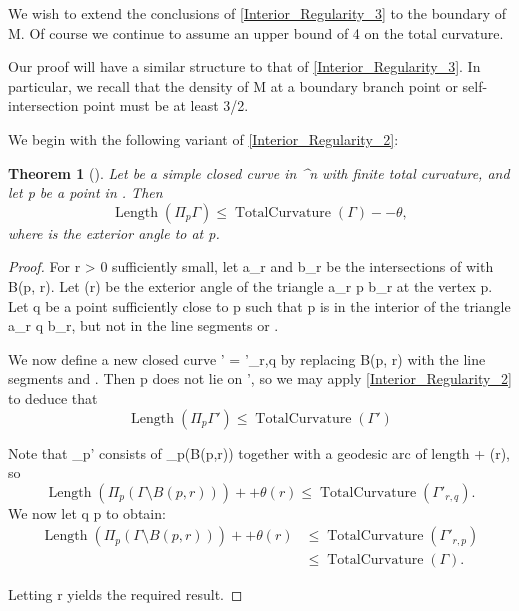 \documentclass[a4paper, 11pt]{article}
\theoremstyle{plain}
\newtheorem{theorem}{Theorem}[section]
\theoremstyle{definition}
\theoremstyle{remark}
\numberwithin{equation}{subsection}
\def\({}
\def\){}
\def\pi{}
\begin{document}
We wish to extend the conclusions of \cref{Interior_Regularity_3} to the boundary of \(M\). Of course we continue to assume an upper bound of \(4\pi\) on the total curvature.

Our proof will have a similar structure to that of \cref{Interior_Regularity_3}. In particular, we recall that the density of \(M\) at a boundary branch point or self-intersection point must be at least \(3/2\).

We begin with the following variant of \cref{Interior_Regularity_2}:

\begin{theorem}[{\cite[Theorem 3.1]{EWW02}}]
\label{Boundary_Regularity_1}
Let \(\Gamma\) be a simple closed curve in \(^{n}\) with finite total curvature, and let \(p\) be a point in \(\Gamma\). Then
\begin{equation}
\operatorname{Length}(\Pi_{p}\Gamma) \leqslant \operatorname{TotalCurvature}(\Gamma) - \pi - \theta,
\end{equation}
where \(\theta\) is the exterior angle to \(\Gamma\) at \(p\).
\end{theorem}

  
\begin{proof}
For \(r > 0\) sufficiently small, let \(a_{r}\) and \(b_{r}\) be the intersections of \(\Gamma\) with \(\partial B(p, r)\). Let \(\theta (r)\) be the exterior angle of the triangle \(\triangle a_{r} p b_{r}\) at the vertex \(p\). Let \(q\) be a point sufficiently close to \(p\) such that \(p\) is in the interior of the triangle \(\triangle a_{r} q b_{r}\), but not in the line segments \(\) or \(\).

We now define a new closed curve \(\Gamma' = \Gamma'_{r,q}\) by replacing \(\Gamma \cap B(p, r)\) with the line segments \(\) and \(\). Then \(p\) does not lie on \(\Gamma'\), so we may apply \cref{Interior_Regularity_2} to deduce that
\begin{equation}
\operatorname{Length}(\Pi_{p}\Gamma') \leqslant \operatorname{TotalCurvature}(\Gamma')
\end{equation}

Note that \(\Pi_{p}\Gamma'\) consists of \(\Pi_{p}(\Gamma \setminus B(p,r))\) together with a geodesic arc of length \(\pi + \theta(r)\), so
\begin{equation}
\operatorname{Length}(\Pi_{p}(\Gamma \setminus B(p,r))) + \pi + \theta(r) \leqslant \operatorname{TotalCurvature}(\Gamma'_{r,q}).
\end{equation}
We now let \(q \rightarrow p\) to obtain:
\begin{align}
\operatorname{Length}(\Pi_{p}(\Gamma \setminus B(p,r))) + \pi + \theta(r) &\leqslant \operatorname{TotalCurvature}(\Gamma'_{r,p}) \\ &\leqslant \operatorname{TotalCurvature}(\Gamma).
\end{align}

Letting \(r \) yields the required result.
\end{proof}
\end{document}
